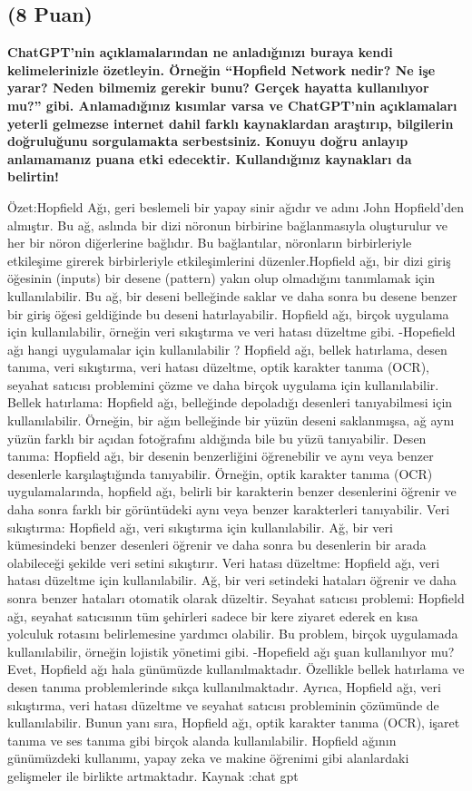 \documentclass[11pt]{article}
\begin{document}
\subsection{(8 Puan)} \textbf{ChatGPT’nin açıklamalarından ne anladığınızı buraya kendi kelimelerinizle özetleyin. Örneğin ``Hopfield Network nedir? Ne işe yarar? Neden bilmemiz gerekir bunu? Gerçek hayatta kullanılıyor mu?'' gibi. Anlamadığınız kısımlar varsa ve ChatGPT’nin açıklamaları yeterli gelmezse internet dahil farklı kaynaklardan araştırıp, bilgilerin doğruluğunu sorgulamakta serbestsiniz. Konuyu doğru anlayıp anlamamanız puana etki edecektir. Kullandığınız kaynakları da belirtin!}

Özet:Hopfield Ağı, geri beslemeli bir yapay sinir ağıdır ve adını John Hopfield'den almıştır. Bu ağ, aslında bir dizi nöronun birbirine bağlanmasıyla oluşturulur ve her bir nöron diğerlerine bağlıdır. Bu bağlantılar, nöronların birbirleriyle 
etkileşime girerek birbirleriyle etkileşimlerini düzenler.Hopfield ağı, bir dizi giriş öğesinin (inputs) bir desene (pattern) yakın olup olmadığını tanımlamak için kullanılabilir. Bu ağ, bir deseni belleğinde saklar ve daha sonra bu desene benzer
 bir giriş öğesi geldiğinde bu deseni hatırlayabilir. Hopfield ağı, birçok uygulama için kullanılabilir, örneğin veri sıkıştırma ve veri hatası düzeltme gibi.
-Hopefield ağı hangi uygulamalar için kullanılabilir ?
Hopfield ağı, bellek hatırlama, desen tanıma, veri sıkıştırma, veri hatası düzeltme, optik karakter tanıma (OCR), seyahat satıcısı problemini çözme ve daha birçok uygulama için kullanılabilir.
Bellek hatırlama: Hopfield ağı, belleğinde depoladığı desenleri tanıyabilmesi için kullanılabilir. Örneğin, bir ağın belleğinde bir yüzün deseni saklanmışsa, ağ aynı yüzün farklı bir açıdan fotoğrafını aldığında bile bu yüzü tanıyabilir.
Desen tanıma: Hopfield ağı, bir desenin benzerliğini öğrenebilir ve aynı veya benzer desenlerle karşılaştığında tanıyabilir. Örneğin, optik karakter tanıma (OCR) uygulamalarında, hopfield ağı, belirli bir karakterin benzer desenlerini öğrenir ve daha sonra farklı bir görüntüdeki aynı veya benzer karakterleri tanıyabilir.
Veri sıkıştırma: Hopfield ağı, veri sıkıştırma için kullanılabilir. Ağ, bir veri kümesindeki benzer desenleri öğrenir ve daha sonra bu desenlerin bir arada olabileceği şekilde veri setini sıkıştırır.
Veri hatası düzeltme: Hopfield ağı, veri hatası düzeltme için kullanılabilir. Ağ, bir veri setindeki hataları öğrenir ve daha sonra benzer hataları otomatik olarak düzeltir.
Seyahat satıcısı problemi: Hopfield ağı, seyahat satıcısının tüm şehirleri sadece bir kere ziyaret ederek en kısa yolculuk rotasını belirlemesine yardımcı olabilir. Bu problem, birçok uygulamada kullanılabilir, örneğin lojistik yönetimi gibi.
-Hopefield ağı şuan kullanılıyor mu?
Evet, Hopfield ağı hala günümüzde kullanılmaktadır. Özellikle bellek hatırlama ve desen tanıma problemlerinde sıkça kullanılmaktadır. Ayrıca, Hopfield ağı, veri sıkıştırma, 
veri hatası düzeltme ve seyahat satıcısı probleminin çözümünde de kullanılabilir. Bunun yanı sıra, Hopfield ağı, optik karakter tanıma (OCR), işaret tanıma ve ses tanıma gibi birçok alanda kullanılabilir. 
Hopfield ağının günümüzdeki kullanımı, yapay zeka ve makine öğrenimi gibi alanlardaki gelişmeler ile birlikte artmaktadır.
Kaynak :chat gpt
\end{document}
